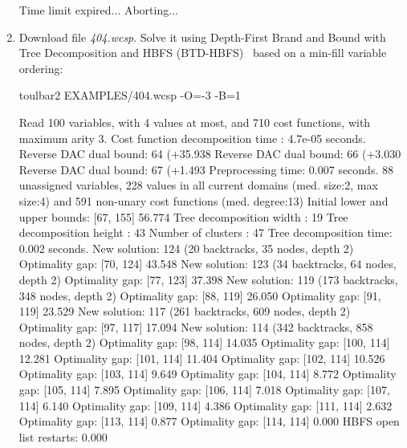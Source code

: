 \begin{enumerate}
{\begin{DoxyCode}
Time limit expired... Aborting...
\end{DoxyCode}}
\item Download file {\em 404.wcsp}. Solve it using Depth-First Brand and Bound with Tree Decomposition and HBFS (BTD-HBFS)~\cite{Schiex06a} based on a min-fill variable ordering:
\begin{DoxyCode}
	toulbar2 EXAMPLES/404.wcsp -O=-3 -B=1
\end{DoxyCode}
{\scriptsize
\begin{DoxyCode}
Read 100 variables, with 4 values at most, and 710 cost functions, with maximum arity 3.
Cost function decomposition time : 4.7e-05 seconds.
Reverse DAC dual bound: 64 (+35.938%
Reverse DAC dual bound: 66 (+3.030%
Reverse DAC dual bound: 67 (+1.493%
Preprocessing time: 0.007 seconds.
88 unassigned variables, 228 values in all current domains (med. size:2, max size:4) and 591 non-unary cost functions (med. degree:13)
Initial lower and upper bounds: [67, 155] 56.774%
Tree decomposition width  : 19
Tree decomposition height : 43
Number of clusters        : 47
Tree decomposition time: 0.002 seconds.
New solution: 124 (20 backtracks, 35 nodes, depth 2)
Optimality gap: [70, 124] 43.548 %
New solution: 123 (34 backtracks, 64 nodes, depth 2)
Optimality gap: [77, 123] 37.398 %
New solution: 119 (173 backtracks, 348 nodes, depth 2)
Optimality gap: [88, 119] 26.050 %
Optimality gap: [91, 119] 23.529 %
New solution: 117 (261 backtracks, 609 nodes, depth 2)
Optimality gap: [97, 117] 17.094 %
New solution: 114 (342 backtracks, 858 nodes, depth 2)
Optimality gap: [98, 114] 14.035 %
Optimality gap: [100, 114] 12.281 %
Optimality gap: [101, 114] 11.404 %
Optimality gap: [102, 114] 10.526 %
Optimality gap: [103, 114] 9.649 %
Optimality gap: [104, 114] 8.772 %
Optimality gap: [105, 114] 7.895 %
Optimality gap: [106, 114] 7.018 %
Optimality gap: [107, 114] 6.140 %
Optimality gap: [109, 114] 4.386 %
Optimality gap: [111, 114] 2.632 %
Optimality gap: [113, 114] 0.877 %
Optimality gap: [114, 114] 0.000 %
HBFS open list restarts: 0.000 %

\end{DoxyCode}}
\end{enumerate}
